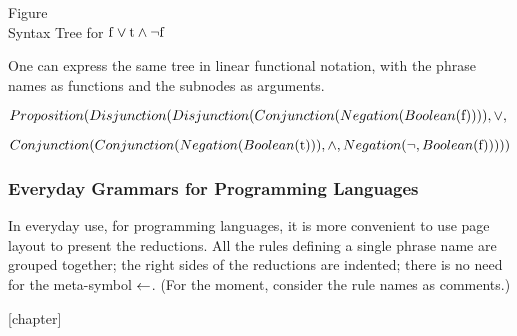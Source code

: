 \begin{center}
Figure~\theSyntaxTree\\
Syntax Tree for ${\rm f}\vee{\rm t}\wedge\neg{\rm f}$
\end{center}

One can express the same tree in linear functional notation, with the phrase
names as functions and the subnodes as arguments.

\vspace{1em}

\noindent
$Proposition(Disjunction(Disjunction(Conjunction(Negation(Boolean(
{\rm f})))),\vee,$

\noindent
$Conjunction(Conjunction(Negation(Boolean({\rm t}))), \wedge, 
Negation(\neg, Boolean({\rm f})))))$
 
\vspace{1em}

\subsubsection{Everyday Grammars for Programming Languages}

In everyday use, for programming languages, 
it is more convenient to use page layout to present the reductions.  
All the rules defining a single phrase name are grouped together; 
the right sides of the reductions are indented; 
there is no need for the meta-symbol $\mbox{$\leftarrow$}$.  (For the moment,
consider the rule names as comments.)

{}[chapter]
\setcounter{PropositionGrammar}{\value{table}}

